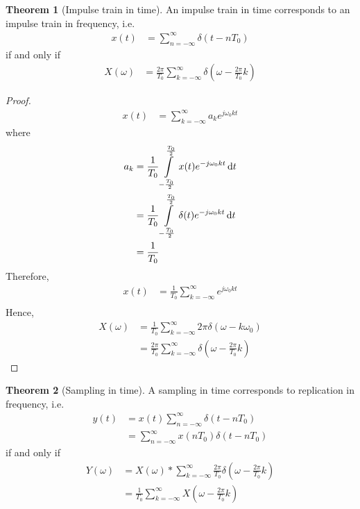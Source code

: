 \documentclass[titlepage, fleqn, a4paper, 12pt, twoside]{article}
\theoremstyle{definition}
\theoremstyle{theorem}
\newtheorem{theorem}{Theorem}
\begin{document}
\begin{theorem}[Impulse train in time]
	An impulse train in time corresponds to an impulse train in frequency, i.e.
	\begin{align*}
		x(t) &= \sum\limits_{n = -\infty}^{\infty} \delta(t - n T_0)
	\end{align*}
	if and only if
	\begin{align*}
		X(\omega) &= \frac{2 \pi}{T_0} \sum\limits_{k = -\infty}^{\infty} \delta\left( \omega - \frac{2 \pi}{T_0} k \right)
	\end{align*}
	\label{thm:impulse_train_in_time}
\end{theorem}

\begin{proof}
	\begin{align*}
		x(t) &= \sum\limits_{k = -\infty}^{\infty} a_k e^{j \omega_0 k t}
	\end{align*}
	where
	\begin{align*}
		a_k &= \frac{1}{T_0} \int\limits_{-\frac{T_0}{2}}^{\frac{T_0}{2}} x(t) e^{-j \omega_0 k t} \dif t\\
		&= \frac{1}{T_0} \int\limits_{-\frac{T_0}{2}}^{\frac{T_0}{2}} \delta(t) e^{-j \omega_0 k t} \dif t\\
		&= \frac{1}{T_0}
	\end{align*}
	Therefore,
	\begin{align*}
		x(t) &= \frac{1}{T_0} \sum\limits_{k = -\infty}^{\infty} e^{j \omega_0 k t}\\
	\end{align*}
	Hence,
	\begin{align*}
		X(\omega) &= \frac{1}{T_0} \sum\limits_{k = -\infty}^{\infty} 2 \pi \delta(\omega - k \omega_0)\\
		&= \frac{2 \pi}{T_0} \sum\limits_{k = -\infty}^{\infty} \delta\left( \omega - \frac{2 \pi}{T_0} k \right)
	\end{align*}
\end{proof}

\begin{theorem}[Sampling in time]
	A sampling in time corresponds to replication in frequency, i.e.
	\begin{align*}
		y(t) &= x(t) \sum\limits_{n = -\infty}^{\infty} \delta(t - n T_0)\\
		&= \sum\limits_{n = -\infty}^{\infty} x(n T_0) \delta(t - n T_0)
	\end{align*}
	if and only if
	\begin{align*}
		Y(\omega) &= X(\omega) \ast \sum\limits_{k = -\infty}^{\infty} \frac{2 \pi}{T_0} \delta\left( \omega - \frac{2 \pi}{T_0} k \right)\\
		&= \frac{1}{T_0} \sum\limits_{k = -\infty}^{\infty} X\left( \omega - \frac{2 \pi}{T_0} k \right)
	\end{align*}
	\label{thm:sampling_in_time}
\end{theorem}
\end{document}

